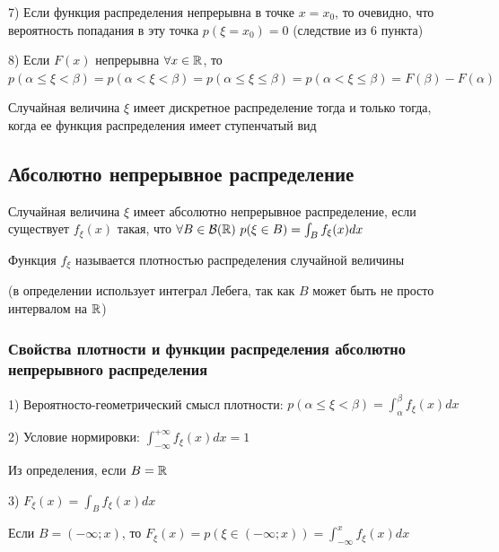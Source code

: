 \documentclass[12pt]{article}
\begin{document}
    7) Если функция распределения непрерывна в точке $x = x_0$, то очевидно, что вероятность попадания в эту точка $p(\xi = x_0) = 0$ (следствие из 6 пункта)
    
    8) Если $F(x)$ непрерывна $\forall x \in \mathbb{R}$, то $p(\alpha \leq \xi < \beta) = p(\alpha < \xi < \beta) = p(\alpha \leq \xi \leq \beta) = p(\alpha < \xi \leq \beta) = F(\beta) - F(\alpha)$
    
    \begin{MyTheorem}
        \Ths Случайная величина $\xi$ имеет дискретное распределение тогда и только тогда, когда ее функция распределения имеет ступенчатый вид
    \end{MyTheorem}

    \subsection{Абсолютно непрерывное распределение}

    \Def Случайная величина $\xi$ имеет абсолютно непрерывное распределение, если существует $f_\xi(x)$ такая, что $\forall B \in \mathcal{B}(\mathbb{R})
    \ p(\xi \in B) = \int_B f_\xi(x)dx$

    Функция $f_\xi$ называется плотностью распределения случайной величины

    (в определении использует интеграл Лебега, так как $B$ может быть не просто интервалом на $\mathbb{R}$)

    \subsubsection{Свойства плотности и функции распределения абсолютно непрерывного распределения}

    1) Вероятносто-геометрический смысл плотности: $p(\alpha \leq \xi < \beta) = \int_{\alpha}^\beta f_\xi(x) dx$

    2) Условие нормировки: $\int_{-\infty}^{+\infty} f_\xi(x)dx = 1$

    \begin{MyProof}
        Из определения, если $B = \mathbb{R}$
    \end{MyProof}

    3) $F_\xi(x) = \int_B f_\xi(x)dx$

    \begin{MyProof}
        Если $B = (-\infty; x)$, то $F_\xi(x) = p(\xi \in (-\infty; x)) = \int_{-\infty}^x f_\xi(x)dx$
    \end{MyProof}
\end{document}
